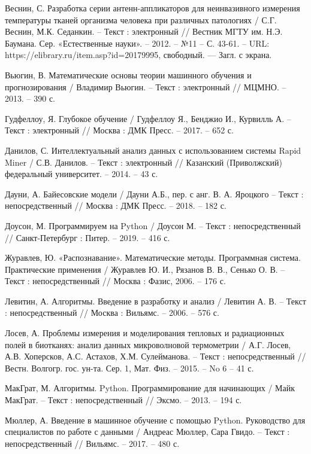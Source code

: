 \begin{thebibliography}{3}
	 Веснин, С. Разработка серии антенн-аппликаторов для неинвазивного измерения температуры тканей организма человека при различных патологиях / С.Г. Веснин, М.К. Седанкин. -- Текст : электронный // Вестник МГТУ им. Н.Э. Баумана. Сер. «Естественные науки». -- 2012. -- №11 -- С. 43-61. -- URL: https://elibrary.ru/item.asp?id=20179995, свободный. — Загл. с экрана.
	
	 Вьюгин, В. Математические основы теории машинного обучения и прогнозирования / Владимир Вьюгин. -- Текст : электронный // МЦМНО. -- 2013. -- 390 с.
	
	 Гудфеллоу, Я.  Глубокое обучение / Гудфеллоу Я., Бенджио И., Курвилль А. -- Текст : электронный // Москва : ДМК Пресс. -- 2017. -- 652 с.	
	
	 Данилов, С.  Интеллектуальный анализ данных с использованием системы Rapid
	Miner / С.В. Данилов. -- Текст : электронный // Казанский (Приволжский) федеральный университет. -- 2014. -- 43 с.			
	
	 Дауни, А. Байесовские модели / Дауни А.Б., пер. с анг. В. А. Яроцкого -- Текст : непосредственный // Москва : ДМК Пресс. -- 2018. -- 182 с.				
	
	 Доусон, М. Программируем на Python / Доусон М. -- Текст : непосредственный // Санкт-Петербург : Питер. -- 2019. -- 416 с.	
	
	 Журавлев, Ю. «Распознавание». Математические методы. Программная система. Практические применения / Журавлев Ю. И., Рязанов В. В., Сенько О. В. -- Текст : непосредственный // Москва : Фазис, 2006. -- 176 с.
	
	 Левитин, А. Алгоритмы. Введение в разработку и анализ / Левитин А. В. -- Текст : непосредственный // Москва : Вильямс. -- 2006. -- 576 с.		
	
	 Лосев, А. Проблемы измерения и моделирования тепловых и радиационных полей в биотканях: анализ данных микроволновой термометрии / А.Г. Лосев, А.В. Хоперсков, А.С. Астахов, Х.М. Сулейманова. -- Текст : непосредственный // Вестн. Волгогр. гос. ун-та. Сер. 1, Мат. Физ. -- 2015. -- No 6 -- 41 с.						
	
	 МакГрат, М. Алгоритмы. Python. Программирование для начинающих / Майк МакГрат. -- Текст : непосредственный // Эксмо. -- 2013. -- 194 с.							
	
	 Мюллер, А. Введение в машинное обучение с помощью Python. Руководство для специалистов по работе с данными / Андреас Мюллер, Сара Гвидо. -- Текст : непосредственный // Вильямс. -- 2017. -- 480 с.				
	

\end{thebibliography}
